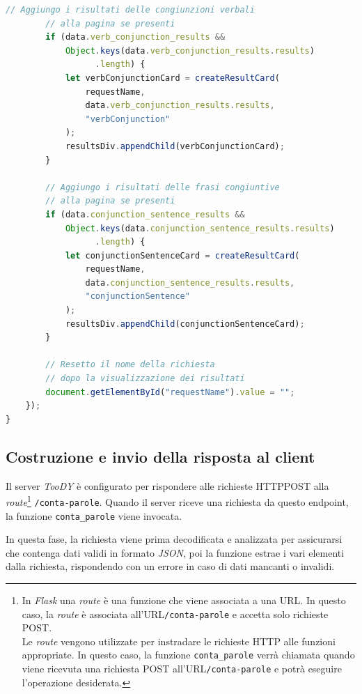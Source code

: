 \documentclass[12pt]{report}
\newcommand{\toody}{\textsl{TooDY}\xspace}
\newcommand{\flask}{\textsl{Flask}\xspace}
\newcommand{\json}{\textsl{JSON}\xspace}
\newcommand{\URL}{\textsf{URL}\xspace}
\newcommand{\http}{\textsf{HTTP}\xspace}
\newcommand{\post}{\textsf{POST}\xspace}
\begin{document}
\begin{lstlisting}[language=JavaScript]
        // Aggiungo i risultati delle congiunzioni verbali
        // alla pagina se presenti
        if (data.verb_conjunction_results &&
            Object.keys(data.verb_conjunction_results.results)
                  .length) {
            let verbConjunctionCard = createResultCard(
                requestName,
                data.verb_conjunction_results.results,
                "verbConjunction"
            );
            resultsDiv.appendChild(verbConjunctionCard);
        }

        // Aggiungo i risultati delle frasi congiuntive
        // alla pagina se presenti
        if (data.conjunction_sentence_results &&
            Object.keys(data.conjunction_sentence_results.results)
                  .length) {
            let conjunctionSentenceCard = createResultCard(
                requestName,
                data.conjunction_sentence_results.results,
                "conjunctionSentence"
            );
            resultsDiv.appendChild(conjunctionSentenceCard);
        }

        // Resetto il nome della richiesta
        // dopo la visualizzazione dei risultati
        document.getElementById("requestName").value = "";
    });
}
\end{lstlisting}


\subsection{Costruzione e invio della risposta al client}
Il server \toody è configurato per rispondere alle richieste \http \post alla \textit{route}\footnote{In \flask una \textit{route} è una funzione che viene associata a una \URL. In questo caso, la \textit{route} è associata all'\URL \texttt{/conta-parole} e accetta solo richieste \post.\\
Le \textit{route} vengono utilizzate per instradare le richieste \http alle funzioni appropriate. In questo caso, la funzione \texttt{conta\_parole} verrà chiamata quando viene ricevuta una richiesta \post all'\URL \texttt{/conta-parole} e potrà eseguire l'operazione desiderata.} \texttt{/conta-parole}. Quando il server riceve una richiesta da questo endpoint, la funzione \texttt{conta\_parole} viene invocata.

In questa fase, la richiesta viene prima decodificata e analizzata per assicurarsi che contenga dati validi in formato \json, poi la funzione estrae i vari elementi dalla richiesta, rispondendo con un errore in caso di dati mancanti o invalidi.
\end{document}
